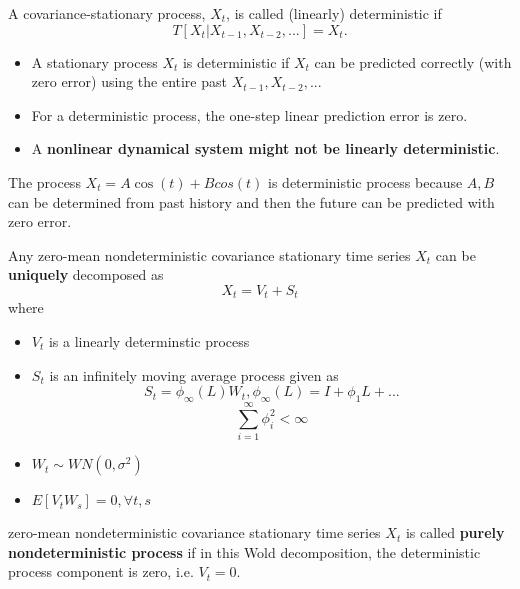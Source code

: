 \begin{definition}
A covariance-stationary process, $X_t$, is called (linearly) deterministic if 
$$T[X_{t}|X_{t-1},X_{t-2},...] = X_t.$$
\end{definition}


\begin{remark}[implications]\hfill
\begin{itemize}
\item A stationary process $X_t$ is deterministic if $X_t$ can be predicted correctly (with zero error) using the entire past $X_{t-1},X_{t-2},...$
\item For a deterministic process, the one-step linear prediction error is zero.
\item A \textbf{nonlinear dynamical system might not be linearly deterministic}. 
\end{itemize}
\end{remark}


\begin{example}
The process $X_t = A\cos(t) + Bcos(t)$ is deterministic process because $A,B$ can be determined from past history and then the future can be predicted with zero error.
\end{example}


\begin{theorem}\label{ch:time-series-analysis:th:wolddecompositionsingleD}
Any zero-mean nondeterministic covariance stationary time series $X_t$ can be \textbf{uniquely} decomposed as
$$X_t = V_t + S_t$$
where 
\begin{itemize}
\item $V_t$ is a linearly determinstic process
\item $S_t$ is an infinitely moving average process given as
$$S_t = \phi_\infty(L)W_t, \phi_\infty(L) = I + \phi_1 L + ...$$
$$\sum_{i=1}^\infty \phi_i^2 < \infty$$
\item $W_t \sim WN(0,\sigma^2)$
\item $E[V_t W_s] = 0,\forall t,s$
\end{itemize}
\end{theorem}

\begin{definition}
zero-mean nondeterministic covariance stationary time series $X_t$ is called \textbf{purely nondeterministic process} if in this Wold decomposition, the deterministic process component is zero, i.e. $V_t = 0$. 
\end{definition}




